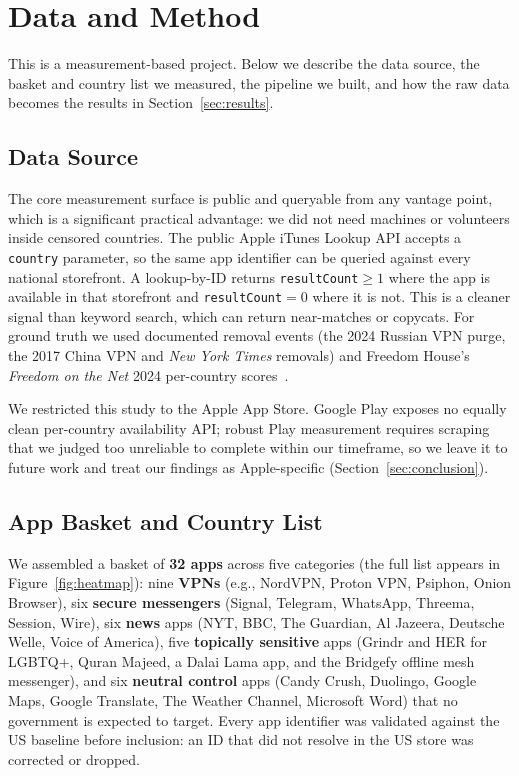 \section{Data and Method}\label{sec:approach}

This is a measurement-based project. Below we describe the data source, the basket
and country list we measured, the pipeline we built, and how the raw data becomes
the results in Section~\ref{sec:results}.

\subsection{Data Source}

The core measurement surface is public and queryable from any vantage point, which
is a significant practical advantage: we did not need machines or volunteers inside
censored countries. The public Apple iTunes Lookup API accepts a \texttt{country}
parameter, so the same app identifier can be queried against every national
storefront. A lookup-by-ID returns \texttt{resultCount}${\geq}1$ where the app is
available in that storefront and \texttt{resultCount}${=}0$ where it is not. This
is a cleaner signal than keyword search, which can return near-matches or
copycats. For ground truth we used documented removal events (the 2024 Russian VPN
purge, the 2017 China VPN and \emph{New York Times} removals) and Freedom House's
\emph{Freedom on the Net} 2024 per-country scores~\cite{fotn2024}.

We restricted this study to the Apple App Store. Google Play exposes no equally
clean per-country availability API; robust Play measurement requires scraping that
we judged too unreliable to complete within our timeframe, so we leave it to future
work and treat our findings as Apple-specific (Section~\ref{sec:conclusion}).

\subsection{App Basket and Country List}

We assembled a basket of \textbf{32 apps} across five categories
(the full list appears in Figure~\ref{fig:heatmap}): nine \textbf{VPNs} (e.g., NordVPN,
Proton VPN, Psiphon, Onion Browser), six \textbf{secure messengers} (Signal,
Telegram, WhatsApp, Threema, Session, Wire), six \textbf{news} apps (NYT, BBC, The
Guardian, Al Jazeera, Deutsche Welle, Voice of America), five \textbf{topically
sensitive} apps (Grindr and HER for LGBTQ+, Quran Majeed, a Dalai Lama app, and
the Bridgefy offline mesh messenger), and six \textbf{neutral control} apps
(Candy Crush, Duolingo, Google Maps, Google Translate, The Weather Channel,
Microsoft Word) that no government is expected to target. Every app identifier was
validated against the US baseline before inclusion: an ID that did not resolve in
the US store was corrected or dropped.


